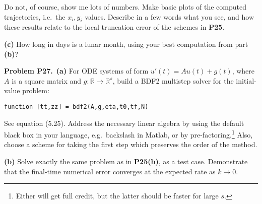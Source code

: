 \documentclass[12pt]{amsart}
\newcommand{\RR}{\mathbb{R}}
\newcommand{\prob}[1]{\bigskip\noindent\textbf{#1}\quad }
\newcommand{\epart}[1]{\medskip\noindent\textbf{(#1)}\quad }
\newcommand{\ppart}[1]{\,\textbf{(#1)}\quad }
\begin{document}
Do not, of course, show me lots of numbers.  Make basic plots of the computed trajectories, i.e.~the $x_i,y_i$ values.  Describe in a few words what you see, and how these results relate to the local truncation error of the schemes in \textbf{P25}.

\epart{c}  How long in days is a lunar month, using your best computation from part \textbf{(b)}?  


\prob{Problem P27.}  \ppart{a}  For ODE systems of form $u'(t)=Au(t)+g(t)$, where $A$ is a square matrix and $g:\RR\to\RR^s$, build a BDF2 multistep solver for the initial-value problem:

\centerline{\texttt{function [tt,zz] = bdf2(A,g,eta,t0,tf,N)}}

\noindent See equation (5.25).  Address the necessary linear algebra by using the default black box in your language, e.g.~backslash in Matlab, or by pre-factoring.\footnote{Either will get full credit, but the latter should be faster for large $s$.}  Also, choose a scheme for taking the first step which preserves the order of the method.

\epart{b}  Solve exactly the same problem as in \textbf{P25(b)}, as a test case.  Demonstrate that the final-time numerical error converges at the expected rate as $k\to 0$.
\end{document}

